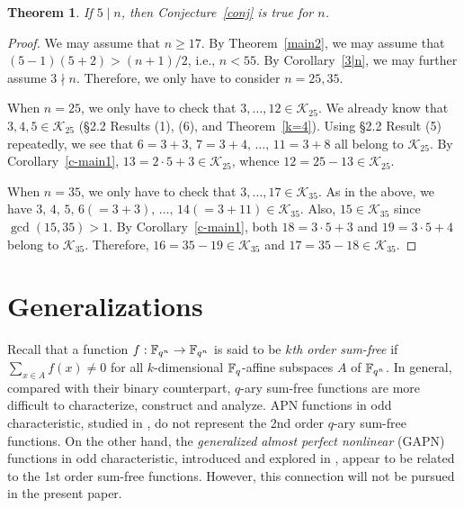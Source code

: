 \documentclass{amsart}
\newtheorem{thm}{Theorem}[section]
\numberwithin{equation}{section}
\theoremstyle{definition}
\newcommand{\f}{\Bbb F}
\begin{document}
\begin{thm}\label{5|n}
If $5\mid n$, then Conjecture~\ref{conj} is true for $n$.
\end{thm}

\begin{proof}
We may assume that $n\ge 17$. %
By Theorem~\ref{main2}, we may assume that $(5-1)(5+2)>(n+1)/2$, i.e., $n<55$. By Corollary~\ref{3|n}, we may further assume $3\nmid n$. Therefore, we only have to consider $n=25,35$.

\medskip
When $n=25$, we only have to check that $3,\dots,12\in\mathcal K_{25}$. We already know that $3,4,5\in\mathcal K_{25}$ (\S2.2 Results (1), (6), and Theorem~\ref{k=4}). Using \S2.2 Result (5) repeatedly, we see that $6=3+3,\, 7=3+4,\,\dots,\,11=3+8$ all belong to $\mathcal K_{25}$. By Corollary~\ref{c-main1}, $13=2\cdot 5+3\in\mathcal K_{25}$, whence $12=25-13\in\mathcal K_{25}$.

\medskip
When $n=35$, we only have to check that $3,\dots,17\in\mathcal K_{35}$. As in the above, we have $3,\,4,\,5,\,6(=3+3),\,\dots,\,14(=3+11)\in\mathcal K_{35}$. Also, $15\in\mathcal K_{35}$ since $\gcd(15,35)>1$. By Corollary~\ref{c-main1}, both $18=3\cdot 5+3$ and $19=3\cdot 5+4$ belong to $\mathcal K_{35}$. Therefore, $16=35-19\in\mathcal K_{35}$ and $17=35-18\in\mathcal K_{35}$.
\end{proof}


\section{Generalizations}

Recall that a function $f:\f_{q^n}\to\f_{q^n}$ is said to be {\em $k$th order sum-free} if $\sum_{x\in A}f(x)\ne 0$ for all $k$-dimensional $\f_q$-affine subspaces $A$ of $\f_{q^n}$. In general, compared with their binary counterpart, $q$-ary sum-free functions are more difficult to characterize, construct and analyze. APN functions in odd characteristic, studied in \cite{Dobbertin-Mills-Muller-Pott-Willems-DM-2003, Helleseth-Rong-Sandberg-IEEE-IT-1999}, do not represent the 2nd order $q$-ary sum-free functions. On the other hand, the {\em generalized almost perfect nonlinear} (GAPN) functions in odd characteristic, introduced and explored in \cite{Kuroda-Tsujie-FFA-2017}, appear to be related to the 1st order sum-free functions. However, this connection will not be pursued in the present paper. 
\end{document}
